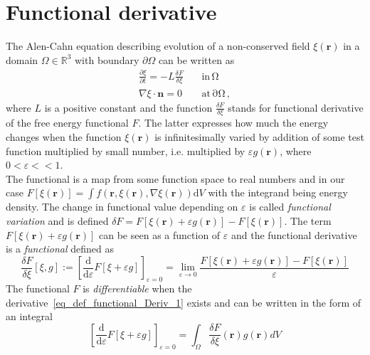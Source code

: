 \chapter{Functional derivative} \label{ch_appendix_functional_derivative}
The Alen-Cahn equation describing evolution of a non-conserved field $\xi(\mathbf{r})$ in a domain $\Omega\in\mathbb{R}^3$ with boundary $\partial\Omega$ can be written as
\begin{align}
	\frac{\partial \xi}{\partial t} = -L\frac{\delta F}{\delta \xi} \quad &\mathrm{in \,\Omega}\\
	\nabla\xi\cdot\bm{n} = 0 \quad &\mathrm{at \, \partial\Omega}\,,
\end{align}
where $L$ is a positive constant and the function $\frac{\delta F}{\delta \xi}$ stands for functional derivative of the free energy functional $F$. The latter expresses how much the energy changes when the function $\xi(\mathbf{r})$ is infinitesimally varied by addition of some test function multiplied by small number, i.e. multiplied by $\varepsilon g(\mathbf{r})$, where $0<\varepsilon<<1$.\\
The functional is a map from some function space to real numbers and in our case $ F[\xi(\bm{r})] = \int f(\bm{r}, \xi(\bm{r}),\nabla\xi(\bm{r}))\mathrm{d}V $ with the integrand being energy density. The change in functional value depending on $\varepsilon$ is called \textit{functional variation} and is defined $\delta F = F[\xi(\mathbf{r})+\varepsilon g(\mathbf{r})]-F[\xi(\mathbf{r})]$. The term $F[\xi(\mathbf{r})+\varepsilon g(\mathbf{r})]$ can be seen as a function of $\varepsilon$ and the functional derivative is a \textit{functional} defined as 
\begin{equation} \label{eq_def_functional_Deriv_1}
	\frac{\delta F}{\delta \xi}[\xi,g] := \left[ \dfrac{\mathrm{d}}{\mathrm{d}\varepsilon}F[\xi + \varepsilon g] \right]_{\varepsilon=0} = \lim_{\varepsilon\rightarrow0} \frac{F[\xi(\mathbf{r})+\varepsilon g(\mathbf{r})] - F[\xi(\mathbf{r})]}{\varepsilon}  
\end{equation}
The functional $F$ is \textit{differentiable} when the derivative~\ref{eq_def_functional_Deriv_1} exists and can be written in the form of an integral
\begin{equation}\label{eq_def_functional_Deriv_2}
	\left[ \dfrac{\mathrm{d}}{\mathrm{d}\varepsilon}F[\xi + \varepsilon g] \right]_{\varepsilon=0} = \int_\Omega \frac{\delta F}{\delta \xi}(\mathbf{r})g(\mathbf{r})dV
\end{equation}
